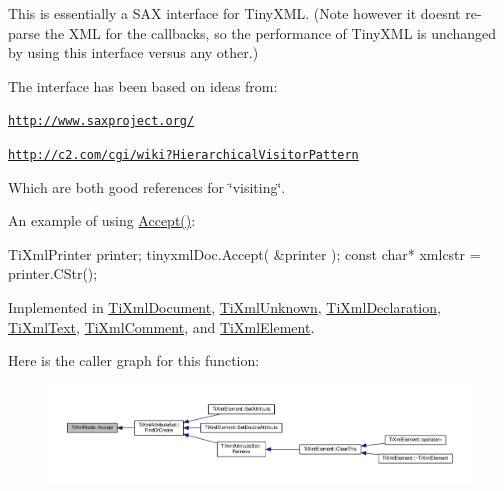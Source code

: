 This is essentially a S\+AX interface for Tiny\+X\+ML. (Note however it doesn\textquotesingle{}t re-\/parse the X\+ML for the callbacks, so the performance of Tiny\+X\+ML is unchanged by using this interface versus any other.)

The interface has been based on ideas from\+:


\begin{DoxyItemize}
\item \href{http://www.saxproject.org/}{\tt http\+://www.\+saxproject.\+org/}
\item \href{http://c2.com/cgi/wiki?HierarchicalVisitorPattern}{\tt http\+://c2.\+com/cgi/wiki?\+Hierarchical\+Visitor\+Pattern}
\end{DoxyItemize}

Which are both good references for \char`\"{}visiting\char`\"{}.

An example of using \hyperlink{class_ti_xml_node_acc0f88b7462c6cb73809d410a4f5bb86}{Accept()}\+: \begin{DoxyVerb}TiXmlPrinter printer;
tinyxmlDoc.Accept( &printer );
const char* xmlcstr = printer.CStr();
\end{DoxyVerb}
 

Implemented in \hyperlink{class_ti_xml_document_a3daab2f472418ef66315750202f762ae}{Ti\+Xml\+Document}, \hyperlink{class_ti_xml_unknown_a4e54d7482e05a837cf83c925cc683380}{Ti\+Xml\+Unknown}, \hyperlink{class_ti_xml_declaration_ab6a6b178161ba9abc2c35058de689864}{Ti\+Xml\+Declaration}, \hyperlink{class_ti_xml_text_a43b9954ebf679557fac1a4453f337b7c}{Ti\+Xml\+Text}, \hyperlink{class_ti_xml_comment_a4382de0e50da973f11a23ea5852568bd}{Ti\+Xml\+Comment}, and \hyperlink{class_ti_xml_element_a31ab28cc3b892a69254391d6bbe08df3}{Ti\+Xml\+Element}.



Here is the caller graph for this function\+:
\nopagebreak
\begin{figure}[H]
\begin{center}
\leavevmode
\includegraphics[width=350pt]{class_ti_xml_node_acc0f88b7462c6cb73809d410a4f5bb86_icgraph}
\end{center}
\end{figure}


